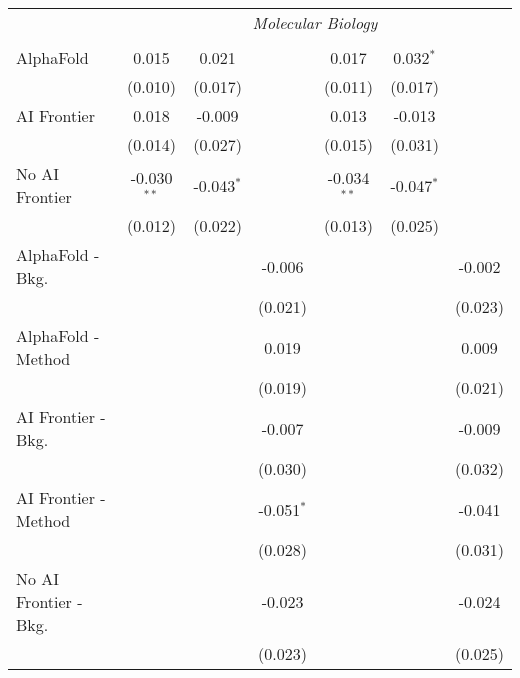 \begin{tabular}{lcccccc}
 & \multicolumn{6}{c}{\textit{Molecular Biology}} \\ \\
   AlphaFold               & 0.015         & 0.021        &              & 0.017         & 0.032$^{*}$  &   \\   
                           & (0.010)       & (0.017)      &              & (0.011)       & (0.017)      &   \\   
   AI Frontier             & 0.018         & -0.009       &              & 0.013         & -0.013       &   \\   
                           & (0.014)       & (0.027)      &              & (0.015)       & (0.031)      &   \\   
   No AI Frontier          & -0.030$^{**}$ & -0.043$^{*}$ &              & -0.034$^{**}$ & -0.047$^{*}$ &   \\   
                           & (0.012)       & (0.022)      &              & (0.013)       & (0.025)      &   \\   
   AlphaFold - Bkg.        &               &              & -0.006       &               &              & -0.002\\   
                           &               &              & (0.021)      &               &              & (0.023)\\   
   AlphaFold - Method      &               &              & 0.019        &               &              & 0.009\\   
                           &               &              & (0.019)      &               &              & (0.021)\\   
   AI Frontier - Bkg.      &               &              & -0.007       &               &              & -0.009\\   
                           &               &              & (0.030)      &               &              & (0.032)\\   
   AI Frontier - Method    &               &              & -0.051$^{*}$ &               &              & -0.041\\   
                           &               &              & (0.028)      &               &              & (0.031)\\   
   No AI Frontier - Bkg.   &               &              & -0.023       &               &              & -0.024\\   
                           &               &              & (0.023)      &               &              & (0.025)\\   

\end{tabular}
